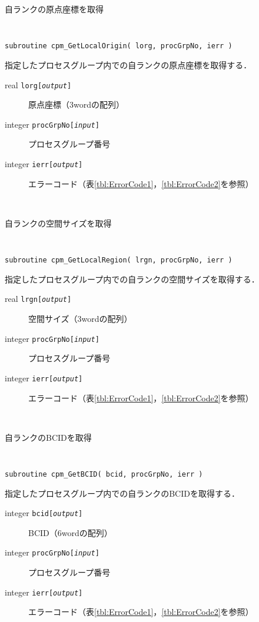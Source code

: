 \begin{spacing}{0.8}
\begin{itembox}[l]{自ランクの原点座標を取得}
{\tt
\begin{verbatim}
subroutine cpm_GetLocalOrigin( lorg, procGrpNo, ierr )
\end{verbatim}
}
指定したプロセスグループ内での自ランクの原点座標を取得する．
\begin{description}
\item[real    {\tt lorg[{\it output}]}] 原点座標（3wordの配列）
\item[integer {\tt procGrpNo[{\it input}]}] プロセスグループ番号
\item[integer {\tt ierr[{\it output}]}] エラーコード（表\ref{tbl:ErrorCode1}，\ref{tbl:ErrorCode2}を参照）
\end{description}
\end{itembox}\\
\end{spacing}

\begin{spacing}{0.8}
\begin{itembox}[l]{自ランクの空間サイズを取得}
{\tt
\begin{verbatim}
subroutine cpm_GetLocalRegion( lrgn, procGrpNo, ierr )
\end{verbatim}
}
指定したプロセスグループ内での自ランクの空間サイズを取得する．
\begin{description}
\item[real    {\tt lrgn[{\it output}]}] 空間サイズ（3wordの配列）
\item[integer {\tt procGrpNo[{\it input}]}] プロセスグループ番号
\item[integer {\tt ierr[{\it output}]}] エラーコード（表\ref{tbl:ErrorCode1}，\ref{tbl:ErrorCode2}を参照）
\end{description}
\end{itembox}\\
\end{spacing}

\begin{spacing}{0.8}
\begin{itembox}[l]{自ランクのBCIDを取得}
{\tt
\begin{verbatim}
subroutine cpm_GetBCID( bcid, procGrpNo, ierr )
\end{verbatim}
}
指定したプロセスグループ内での自ランクのBCIDを取得する．
\begin{description}
\item[integer {\tt bcid[{\it output}]}] BCID（6wordの配列）
\item[integer {\tt procGrpNo[{\it input}]}] プロセスグループ番号
\item[integer {\tt ierr[{\it output}]}] エラーコード（表\ref{tbl:ErrorCode1}，\ref{tbl:ErrorCode2}を参照）
\end{description}
\end{itembox}\\
\end{spacing}

